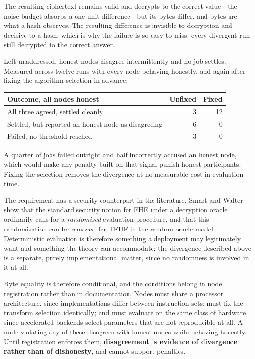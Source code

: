 \documentclass[12pt,a4paper]{article}
\begin{document}
The resulting ciphertext remains valid and decrypts to the correct value---the noise budget absorbs a one-unit difference---but its bytes differ, and bytes are what a hash observes.
The resulting difference is invisible to decryption and decisive to a hash, which is why the failure is so easy to miss: every divergent run still decrypted to the correct answer.

Left unaddressed, honest nodes disagree intermittently and no job settles.
Measured across twelve runs with every node behaving honestly, and again after fixing the algorithm selection in advance:

\begin{center}
\begin{tabular}{lrr}
\hline
Outcome, all nodes honest & Unfixed & Fixed \\
\hline
All three agreed, settled cleanly & 3 & 12 \\
Settled, but reported an honest node as disagreeing & 6 & 0 \\
Failed, no threshold reached & 3 & 0 \\
\hline
\end{tabular}
\end{center}

A quarter of jobs failed outright and half incorrectly accused an honest node, which would make any penalty built on that signal punish honest participants.
Fixing the selection removes the divergence at no measurable cost in evaluation time.

The requirement has a security counterpart in the literature.
Smart and Walter~\cite{deterministic_tfhe} show that the standard security notion for FHE under a decryption oracle ordinarily calls for a \emph{randomised} evaluation procedure, and that this randomisation can be removed for TFHE in the random oracle model.
Deterministic evaluation is therefore something a deployment may legitimately want and something the theory can accommodate; the divergence described above is a separate, purely implementational matter, since no randomness is involved in it at all.

Byte equality is therefore conditional, and the conditions belong in node registration rather than in documentation.
Nodes must share a processor architecture, since implementations differ between instruction sets; must fix the transform selection identically; and must evaluate on the same class of hardware, since accelerated backends select parameters that are not reproducible at all.
A node violating any of these disagrees with honest nodes while behaving honestly.
Until registration enforces them, \textbf{disagreement is evidence of divergence rather than of dishonesty}, and cannot support penalties.
\end{document}
